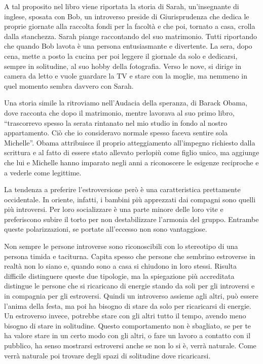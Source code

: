 \documentclass[12pt]{book} %
\begin{document}
\begin{mdframed}[linewidth=1pt]
A tal proposito nel libro viene riportata la storia di Sarah, un'insegnante di inglese, sposata con Bob, un introverso
preside di Giurisprudenza che dedica le proprie giornate alla raccolta fondi per la facoltà e che poi, tornato a casa,
crolla dalla stanchezza. Sarah piange raccontando del suo matrimonio. Tutti riportando che quando Bob lavota è una
persona entusiasmante e divertente. La sera, dopo cena, mette a posto la cucina per poi leggere il giornale da solo e
dedicarsi, sempre in solitudine, al suo hobby della fotografia. Verso le nove, si dirige in camera da letto e vuole
guardare la TV e stare con la moglie, ma nemmeno in quel momento sembra davvero con Sarah.

Una storia simile la ritroviamo nell'Audacia della speranza, di Barack Obama, dove racconta che dopo il matrimonio,
mentre lavorava al suo primo libro, “trascorrevo spesso la serata rintanato nel mio studio in fondo al nostro
appartamento. Ciò che io consideravo normale spesso faceva sentire sola Michelle”. Obama attribuisce il proprio
atteggiamento all'impegno richiesto dalla scrittura e al fatto di essere stato allevato perlopiù come figlio unico, ma
aggiunge che lui e Michelle hanno imparato negli anni a riconoscere le esigenze reciproche e a vederle come legittime. 

La tendenza a preferire l'estroversione però è una caratteristica prettamente occidentale. In
oriente, infatti, i bambini più apprezzati dai compagni sono quelli più introversi. Per loro socializzare è una parte
minore delle loro vite e preferiscono subire il torto per non destabilizzare l'armonia del gruppo. Entrambe queste
polarizzazioni, se portate all'eccesso non sono vantaggiose.

Non sempre le persone introverse sono riconoscibili con lo stereotipo di una persona timida e taciturna. Capita spesso
che persone che sembrino estroverse in realtà non lo siano e, quando sono a casa si chiudono in loro stessi. Risulta
difficile distinguere queste due tipologie, ma la spiegazione più accreditata distingue le persone che si ricaricano di
energie stando da soli per gli introversi e in compagnia per gli estroversi. Quindi un introverso assieme agli altri,
può essere l'anima della festa, ma poi ha bisogno di stare da solo per ricaricarsi di energie. Un
estroverso invece, potrebbe stare con gli altri tutto il tempo, avendo meno bisogno di stare in solitudine. Questo
comportamento non è sbagliato, se per te ha valore stare in un certo modo con gli altri, o fare un lavoro a contatto
con il pubblico, ha senso mostrarsi estroversi anche se non lo si è, verrà naturale. Come verrà naturale poi trovare
degli spazi di solitudine dove ricaricarsi.
\end{mdframed}
\end{document}
